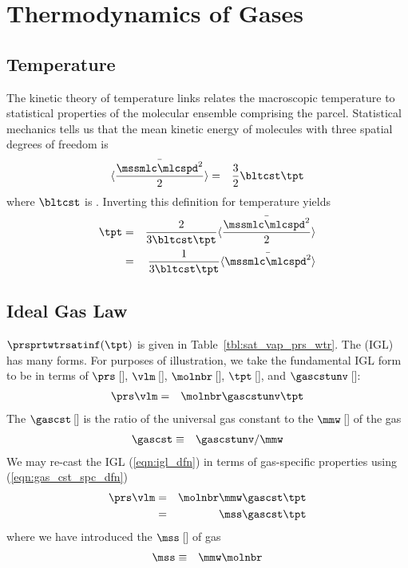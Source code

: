 \documentclass[12pt,twoside]{book}
\begin{document}
\chapter{Thermodynamics of Gases}\label{sxn:tdy}

\section{Temperature}\label{sxn:tpt}
The kinetic theory of temperature links relates the macroscopic
temperature to statistical properties of the molecular ensemble
comprising the parcel.
Statistical mechanics \cite[e.g.,][p.~8]{Tso02} tells us that the mean 
kinetic energy of molecules with three spatial degrees of freedom is
\begin{eqnarray}
\langle \frac{\bar{\mssmlc\mlcspd^{2}}}{2} \rangle & = & \frac{3}{2} \bltcst\tpt
\label{eqn:nrg_knt_dfn}
\end{eqnarray}
where $\bltcst$ is .
Inverting this definition for temperature yields
\begin{eqnarray}
\tpt & = & \frac{2}{3\bltcst\tpt} \langle \frac{\bar{\mssmlc\mlcspd^{2}}}{2} \rangle \\
& = & \frac{1}{3\bltcst\tpt} \langle \bar{\mssmlc\mlcspd^{2}} \rangle 
\label{eqn:tpt_knt_dfn}
\end{eqnarray}

\section{Ideal Gas Law}\label{sxn:igl}
$\prsprtwtrsatinf(\tpt)$ is given in Table~\ref{tbl:sat_vap_prs_wtr}.
The  (IGL) has many forms.
For purposes of illustration, we take the fundamental IGL form to be
in terms of
 $\prs$\,[\Pa], 
 $\vlm$\,[\mC],
 $\molnbr$\,[\mol],
 $\tpt$\,[\K],
and  $\gascstunv$\,[\jxmolK]:
\begin{eqnarray}
\prs \vlm & = & \molnbr \gascstunv \tpt
\label{eqn:igl_dfn}
\end{eqnarray}
The  $\gascst$\,[\jxkgK] is the ratio of
the universal gas constant to the 
$\mmw$\,[\kgxmol] of the gas 
\begin{eqnarray}
\gascst & \equiv & \gascstunv / \mmw
\label{eqn:gas_cst_spc_dfn}
\end{eqnarray}
We may re-cast the IGL (\ref{eqn:igl_dfn}) in terms of gas-specific 
properties using (\ref{eqn:gas_cst_spc_dfn}) 
\begin{eqnarray}
\prs \vlm & = & \molnbr \mmw \gascst \tpt \nonumber \\
& = & \mss \gascst \tpt
\label{eqn:igl_2_dfn}
\end{eqnarray}
where we have introduced the  $\mss$\,[\kg] of gas 
\begin{eqnarray}
\mss & \equiv & \mmw \molnbr
\label{eqn:mss_dfn}
\end{eqnarray}
\end{document}
